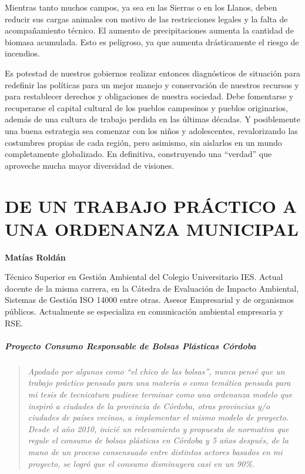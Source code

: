 \documentclass[
]{article}
\begin{document}
Mientras tanto muchos campos, ya sea en las Sierras o en los Llanos,
deben reducir sus cargas animales con motivo de las restricciones
legales y la falta de acompañamiento técnico. El aumento de
precipitaciones aumenta la cantidad de biomasa acumulada. Esto es
peligroso, ya que aumenta drásticamente el riesgo de incendios.

Es potestad de nuestros gobiernos realizar entonces diagnósticos de
situación para redefinir las políticas para un mejor manejo y
conservación de nuestros recursos y para restablecer derechos y
obligaciones de nuestra sociedad. Debe fomentarse y recuperarse el
capital cultural de los pueblos campesinos y pueblos originarios, además
de una cultura de trabajo perdida en las últimas décadas. Y posiblemente
una buena estrategia sea comenzar con los niños y adolescentes,
revalorizando las costumbres propias de cada región, pero asimismo, sin
aislarlos en un mundo completamente globalizado. En definitiva,
construyendo una ``verdad'' que aproveche mucha mayor diversidad de
visiones.

\cleardoublepage

\hypertarget{de-un-trabajo-pruxe1ctico-a-una-ordenanza-municipal}{%
\section{DE UN TRABAJO PRÁCTICO A UNA ORDENANZA
MUNICIPAL}\label{de-un-trabajo-pruxe1ctico-a-una-ordenanza-municipal}}

\textbf{Matías Roldán}

Técnico Superior en Gestión Ambiental del Colegio Universitario IES.
Actual docente de la misma carrera, en la Cátedra de Evaluación de
Impacto Ambiental, Sistemas de Gestión ISO 14000 entre otras. Asesor
Empresarial y de organismos públicos. Actualmente se especializa en
comunicación ambiental empresaria y RSE.

\hypertarget{proyecto-consumo-responsable-de-bolsas-pluxe1sticas-cuxf3rdoba}{%
\subparagraph{Proyecto Consumo Responsable de Bolsas Plásticas
Córdoba}\label{proyecto-consumo-responsable-de-bolsas-pluxe1sticas-cuxf3rdoba}}

\begin{quote}
\emph{Apodado por algunos como ``el chico de las bolsas'', nunca pensé
que un trabajo práctico pensado para una materia o como temática pensada
para mi tesis de tecnicatura pudiese terminar como una ordenanza modelo
que inspiró a ciudades de la provincia de Córdoba, otras provincias y/o
ciudades de países vecinos, a implementar el mismo modelo de proyecto.
Desde el año 2010, inicié un relevamiento y propuesta de normativa que
regule el consumo de bolsas plásticas en Córdoba y 5 años después, de la
mano de un proceso consensuado entre distintos actores basados en mi
proyecto, se logró que el consumo disminuyera casi en un 90\%.}
\end{quote}
\end{document}
